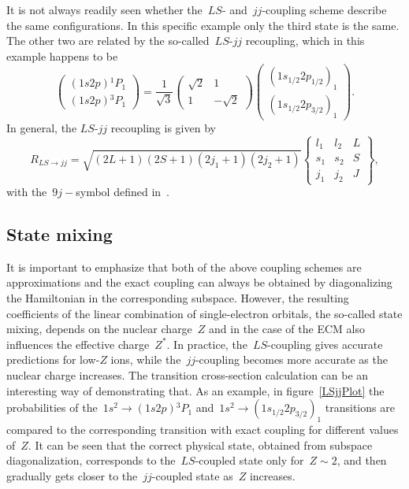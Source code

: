 It is not always readily seen whether the~$LS$- and~$jj$-coupling scheme describe the same configurations. In this specific example only the third state is the same. The other two are related by the so-called~$LS$-$jj$ recoupling, which in this example happens to be
\begin{equation}
    \left(\begin{matrix}
    (1s 2p) {}^1P_1 \\
    (1s 2p) {}^3P_1
    \end{matrix}\right)
    =
    \frac{1}{\sqrt{3}}
    \left(\begin{matrix}
    \sqrt{2} & 1 \\
    1 & -\sqrt{2}
    \end{matrix}\right)
   \left(\begin{matrix}
    (1s_{1/2} 2p_{1/2})_1 \\
    (1s_{1/2} 2p_{3/2})_1
    \end{matrix}\right).
\end{equation}
In general, the $LS$-$jj$ recoupling is given by
\begin{equation}
    R_{LS \rightarrow jj} = \sqrt{(2L+1)(2S+1)(2j_1+1)(2j_2+1)}\left\{\begin{matrix}l_1&l_2&L\\s_1&s_2&S\\j_1&j_2&J\end{matrix}\right\},
\end{equation}
with the~$9j-$symbol defined in~\cite{9j}.

\subsection{State mixing}

It is important to emphasize that both of the above coupling schemes are approximations and the exact coupling can always be obtained by diagonalizing the Hamiltonian in the corresponding subspace. However, the resulting coefficients of the linear combination of single-electron orbitals, the so-called state mixing, depends on the nuclear charge~$Z$ and in the case of the ECM also influences the effective charge~$Z^*$. In practice, the~$LS$-coupling gives accurate predictions for low-$Z$ ions, while the~$jj$-coupling becomes more accurate as the nuclear charge increases. The transition cross-section calculation can be an interesting way of demonstrating that. As an example, in figure~\ref{LSjjPlot} the probabilities of the~$1s^2 \rightarrow (1s 2p) {}^3P_1$ and~$1s^2 \rightarrow (1s_{1/2} 2p_{3/2})_1$ transitions are compared to the corresponding transition with exact coupling for different values of~$Z$. It can be seen that the correct physical state, obtained from subspace diagonalization, corresponds to the~$LS$-coupled state only for~$Z \sim 2$, and then gradually gets closer to the~$jj$-coupled state as~$Z$ increases.

